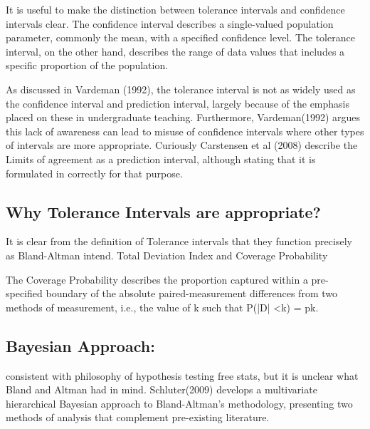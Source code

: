 It is useful to make the distinction between tolerance intervals and confidence intervals clear. The confidence interval describes a single-valued population parameter, commonly the mean, with a specified confidence level. The tolerance interval, on the other hand, describes the range of data values that includes a specific proportion of the population.

As discussed in Vardeman (1992), the tolerance interval is not as widely used as the confidence interval and prediction interval, largely because of the emphasis placed on these in undergraduate teaching. Furthermore, Vardeman(1992) argues this lack of awareness can lead to misuse of confidence intervals where other types of intervals are more appropriate.
Curiously Carstensen et al (2008) describe the Limits of agreement as a prediction interval, although stating that it is formulated in correctly for that purpose.

\subsection*{Why Tolerance Intervals are appropriate?}
It is clear from the definition of Tolerance intervals that they function precisely as Bland-Altman intend.
Total Deviation Index and Coverage Probability

The Coverage Probability describes the proportion captured within a pre-specified boundary of the absolute paired-measurement differences from two methods of measurement, i.e., the value of k such that P(|D| <k) = pk.

\subsection*{Bayesian Approach: }
consistent with philosophy of hypothesis testing free stats, but it is unclear what Bland and Altman had in mind.
Schluter(2009) develops a multivariate hierarchical Bayesian approach to Bland-Altman’s methodology, presenting two methods of analysis that complement pre-existing literature. 


\newpage

